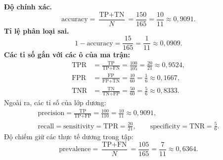 \medskip\textbf{Độ chính xác.}
\[
\text{accuracy}=\frac{\text{TP}+\text{TN}}{N}=\frac{150}{165}=\frac{10}{11}\approx 0{,}9091.
\]
\textbf{Tỉ lệ phân loại sai.}
\[
1-\text{accuracy}=\frac{15}{165}=\frac{1}{11}\approx 0{,}0909.
\]
\textbf{Các tỉ số gắn với các ô của ma trận:}
\begin{align*}
\text{TPR} &= \frac{\text{TP}}{\text{TP}+\text{FN}}=\frac{100}{105}=\frac{20}{21}\approx 0{,}9524,\\
\text{FPR} &= \frac{\text{FP}}{\text{FP}+\text{TN}}=\frac{10}{60}=\frac16\approx 0{,}1667,\\
\text{TNR} &= \frac{\text{TN}}{\text{TN}+\text{FP}}=\frac{50}{60}=\frac56\approx 0{,}8333.
\end{align*}
Ngoài ra, các tỉ số của lớp dương:
\begin{align*}
\text{precision}=\frac{\text{TP}}{\text{TP}+\text{FP}}=\frac{100}{110}=\frac{10}{11}\approx 0{,}9091,\\
\text{recall}=\text{sensitivity}=\text{TPR}=\frac{20}{21},\qquad
\text{specificity}=\text{TNR}=\frac56.
\end{align*}
Độ chiếm giữ các thực tế dương trong tập:
\[
\text{prevalence}=\frac{\text{TP}+\text{FN}}{N}=\frac{105}{165}=\frac{7}{11}\approx 0{,}6364.
\]
